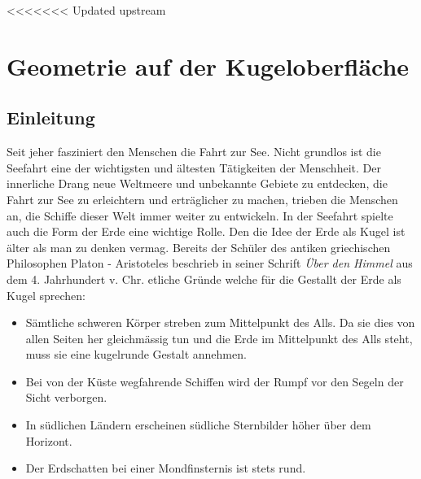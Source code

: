 <<<<<<< Updated upstream
\chapter{Geometrie auf der Kugeloberfläche\label{chapter:kugel}}
\begin{refsection}

\section{Einleitung}
Seit jeher fasziniert den Menschen die Fahrt zur See. Nicht grundlos ist die Seefahrt eine der wichtigsten und ältesten Tätigkeiten der Menschheit. Der innerliche Drang neue Weltmeere und unbekannte Gebiete zu entdecken, die Fahrt zur See zu erleichtern und erträglicher zu machen, trieben die Menschen an, die Schiffe dieser Welt immer weiter zu entwickeln.
In der Seefahrt spielte auch die Form der Erde eine wichtige Rolle. Den die Idee der Erde als Kugel ist älter als man zu denken vermag. Bereits der Schüler des antiken griechischen Philosophen Platon - Aristoteles beschrieb in seiner Schrift \textit{Über den Himmel} aus dem 4. Jahrhundert v. Chr. etliche Gründe welche für die Gestallt der Erde als Kugel sprechen:
\begin{itemize}
      \item Sämtliche schweren Körper streben zum Mittelpunkt des Alls. Da sie dies von allen Seiten her gleichmässig tun und die Erde im Mittelpunkt des Alls steht, muss sie eine kugelrunde Gestalt annehmen. 
\item Bei von der Küste wegfahrende Schiffen wird der Rumpf vor den Segeln der Sicht verborgen. 
\item In südlichen Ländern erscheinen südliche Sternbilder höher über dem Horizont.
\item Der Erdschatten bei einer Mondfinsternis ist stets rund.
\end{itemize}


\end{refsection}

